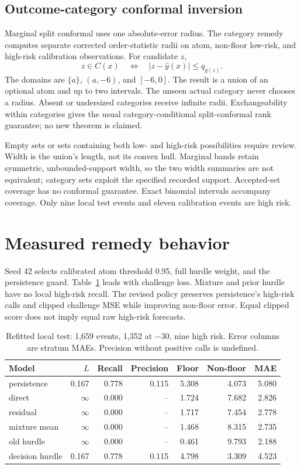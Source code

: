 \documentclass[10pt]{article}
\begin{document}
\subsection{Outcome-category conformal inversion}
Marginal split conformal uses one absolute-error radius. The category remedy computes separate corrected order-statistic radii on atom, non-floor low-risk, and high-risk calibration observations. For candidate $z$,
\[
z\in C(x)\quad\Longleftrightarrow\quad |z-\hat y(x)|\leq q_{g(z)}.
\]
The domains are $\{a\}$, $(a,-6)$, and $[-6,0]$. The result is a union of an optional atom and up to two intervals. The unseen actual category never chooses a radius. Absent or undersized categories receive infinite radii. Exchangeability within categories gives the usual category-conditional split-conformal rank guarantee; no new theorem is claimed.

Empty sets or sets containing both low- and high-risk possibilities require review. Width is the union's length, not its convex hull. Marginal bands retain symmetric, unbounded-support width, so the two width summaries are not equivalent; category sets exploit the specified recorded support. Accepted-set coverage has no conformal guarantee. Exact binomial intervals accompany coverage. Only nine local test events and eleven calibration events are high risk.

\section{Measured remedy behavior}
Seed 42 selects calibrated atom threshold 0.95, full hurdle weight, and the persistence guard. Table~\ref{tab:remedies} leads with challenge loss. Mixture and prior hurdle have no local high-risk recall. The revised policy preserves persistence's high-risk calls and clipped challenge MSE while improving non-floor error. Equal clipped score does not imply equal raw high-risk forecasts.

\begin{table}[ht]
\centering\small
\caption{Refitted local test: 1,659 events, 1,352 at $-30$, nine high risk. Error columns are stratum MAEs. Precision without positive calls is undefined.}
\label{tab:remedies}
\begin{tabular}{lrrrrrr}\hline
Model & $L$ & Recall & Precision & Floor & Non-floor & MAE\\\hline
persistence & 0.167 & 0.778 & 0.115 & 5.308 & 4.073 & 5.080\\
direct & $\infty$ & 0.000 & -- & 1.724 & 7.682 & 2.826\\
residual & $\infty$ & 0.000 & -- & 1.717 & 7.454 & 2.778\\
mixture mean & $\infty$ & 0.000 & -- & 1.468 & 8.315 & 2.735\\
old hurdle & $\infty$ & 0.000 & -- & 0.461 & 9.793 & 2.188\\
decision hurdle & 0.167 & 0.778 & 0.115 & 4.798 & 3.309 & 4.523\\
\hline\end{tabular}
\end{table}
\end{document}
